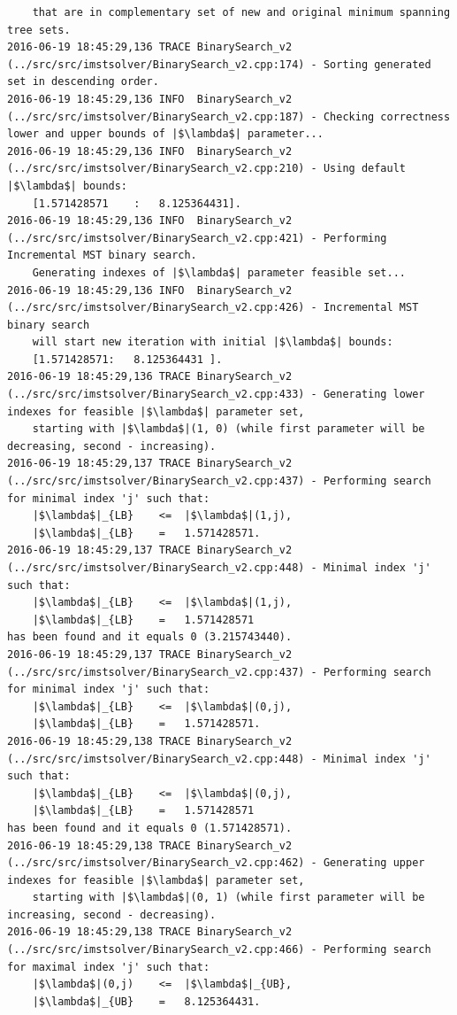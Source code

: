 \begin{verbatim}
	that are in complementary set of new and original minimum spanning tree sets.
2016-06-19 18:45:29,136 TRACE BinarySearch_v2 (../src/src/imstsolver/BinarySearch_v2.cpp:174) - Sorting generated set in descending order.
2016-06-19 18:45:29,136 INFO  BinarySearch_v2 (../src/src/imstsolver/BinarySearch_v2.cpp:187) - Checking correctness lower and upper bounds of |$\lambda$| parameter...
2016-06-19 18:45:29,136 INFO  BinarySearch_v2 (../src/src/imstsolver/BinarySearch_v2.cpp:210) - Using default |$\lambda$| bounds:
	[1.571428571	:	8.125364431].
2016-06-19 18:45:29,136 INFO  BinarySearch_v2 (../src/src/imstsolver/BinarySearch_v2.cpp:421) - Performing Incremental MST binary search. 
	Generating indexes of |$\lambda$| parameter feasible set...
2016-06-19 18:45:29,136 INFO  BinarySearch_v2 (../src/src/imstsolver/BinarySearch_v2.cpp:426) - Incremental MST binary search 
	will start new iteration with initial |$\lambda$| bounds:
	[1.571428571:	8.125364431	].
2016-06-19 18:45:29,136 TRACE BinarySearch_v2 (../src/src/imstsolver/BinarySearch_v2.cpp:433) - Generating lower indexes for feasible |$\lambda$| parameter set, 
	starting with |$\lambda$|(1, 0) (while first parameter will be decreasing, second - increasing).
2016-06-19 18:45:29,137 TRACE BinarySearch_v2 (../src/src/imstsolver/BinarySearch_v2.cpp:437) - Performing search for minimal index 'j' such that:
	|$\lambda$|_{LB}	<=	|$\lambda$|(1,j),
	|$\lambda$|_{LB}	=	1.571428571.
2016-06-19 18:45:29,137 TRACE BinarySearch_v2 (../src/src/imstsolver/BinarySearch_v2.cpp:448) - Minimal index 'j' such that:
	|$\lambda$|_{LB}	<=	|$\lambda$|(1,j),
	|$\lambda$|_{LB}	=	1.571428571
has been found and it equals 0 (3.215743440).
2016-06-19 18:45:29,137 TRACE BinarySearch_v2 (../src/src/imstsolver/BinarySearch_v2.cpp:437) - Performing search for minimal index 'j' such that:
	|$\lambda$|_{LB}	<=	|$\lambda$|(0,j),
	|$\lambda$|_{LB}	=	1.571428571.
2016-06-19 18:45:29,138 TRACE BinarySearch_v2 (../src/src/imstsolver/BinarySearch_v2.cpp:448) - Minimal index 'j' such that:
	|$\lambda$|_{LB}	<=	|$\lambda$|(0,j),
	|$\lambda$|_{LB}	=	1.571428571
has been found and it equals 0 (1.571428571).
2016-06-19 18:45:29,138 TRACE BinarySearch_v2 (../src/src/imstsolver/BinarySearch_v2.cpp:462) - Generating upper indexes for feasible |$\lambda$| parameter set,
	starting with |$\lambda$|(0, 1) (while first parameter will be increasing, second - decreasing).
2016-06-19 18:45:29,138 TRACE BinarySearch_v2 (../src/src/imstsolver/BinarySearch_v2.cpp:466) - Performing search for maximal index 'j' such that:
	|$\lambda$|(0,j)	<=	|$\lambda$|_{UB},
	|$\lambda$|_{UB}	=	8.125364431.

\end{verbatim}
